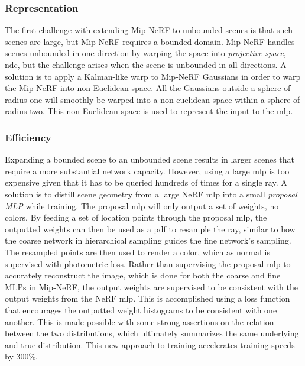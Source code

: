 \subsubsection{Representation}
The first challenge with extending Mip-NeRF to unbounded scenes is that such scenes are large, but Mip-NeRF requires a bounded domain. Mip-NeRF handles scenes unbounded in one direction by warping the space into \textit{projective space}, \acrfull{ndc}, but the challenge arises when the scene is unbounded in all directions. A solution is to apply a Kalman-like warp to Mip-NeRF Gaussians in order to warp the Mip-NeRF into non-Euclidean space. All the Gaussians outside a sphere of radius one will smoothly be warped into a non-euclidean space within a sphere of radius two. This non-Euclidean space is used to represent the input to the \acrshort{mlp}. 


\subsubsection{Efficiency}
Expanding a bounded scene to an unbounded scene results in larger scenes that require a more substantial network capacity. However, using a large \acrshort{mlp} is too expensive given that it has to be queried hundreds of times for a single ray. A solution is to distill scene geometry from a large NeRF \acrshort{mlp} into a small \textit{proposal MLP} while training. The proposal \acrshort{mlp} will only output a set of weights, no colors. By feeding a set of location points through the proposal \acrshort{mlp}, the outputted weights can then be used as a \acrshort{pdf} to resample the ray, similar to how the coarse network in hierarchical sampling guides the fine network's sampling. The resampled points are then used to render a color, which as normal is supervised with photometric loss. Rather than supervising the proposal \acrshort{mlp} to accurately reconstruct the image, which is done for both the coarse and fine MLPs in Mip-NeRF, the output weights are supervised to be consistent with the output weights from the NeRF \acrshort{mlp}. This is accomplished using a loss function that encourages the outputted weight histograms to be consistent with one another. This is made possible with some strong assertions on the relation between the two distributions, which ultimately summarizes the same underlying and true distribution. This new approach to training accelerates training speeds by 300\%.


